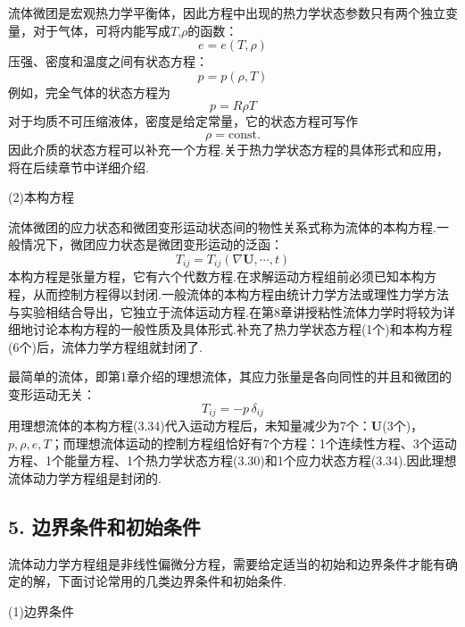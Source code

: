 流体微团是宏观热力学平衡体，因此方程中出现的热力学状态参数只有两个独立变量，对于气体，可将内能写成$T$,$\rho$的函数：
\begin{equation*}
e=e(T,\rho)
\tag{3.30}
\end{equation*}
压强、密度和温度之间有状态方程：
\begin{equation*}
p=p(\rho,T)
\tag{3.31}
\end{equation*}
例如，完全气体的状态方程为
\begin{equation*}
p=R\rho T
\tag{3.32a}
\end{equation*}
对于均质不可压缩液体，密度是给定常量，它的状态方程可写作
\begin{equation*}
\rho=\mathrm{const.}
\tag{3.32b}
\end{equation*}
因此介质的状态方程可以补充一个方程.关于热力学状态方程的具体形式和应用，将在后续章节中详细介绍.

(2)本构方程

流体微团的应力状态和微团变形运动状态间的物性关系式称为流体的本构方程.一般情况下，微团应力状态是微团变形运动的泛函：
\begin{equation*}
T_{ij}=T_{ij}(\nabla\boldsymbol{U},\cdots,t)
\tag{3.33}
\end{equation*}
本构方程是张量方程，它有六个代数方程.在求解运动方程组前必须已知本构方程，从而控制方程得以封闭.一般流体的本构方程由统计力学方法或理性力学方法与实验相结合导出，它独立于流体运动方程.在第8章讲授粘性流体力学时将较为详细地讨论本构方程的一般性质及具体形式.补充了热力学状态方程(1个)和本构方程(6个)后，流体力学方程组就封闭了.

最简单的流体，即第1章介绍的理想流体，其应力张量是各向同性的并且和微团的变形运动无关：
\begin{equation*}
T_{ij}=-p\,\delta_{ij}
\tag{3.34}
\end{equation*}
用理想流体的本构方程(3.34)代入运动方程后，未知量减少为7个：$\boldsymbol{U}$(3个)，$p,\rho,e,T$；而理想流体运动的控制方程组恰好有7个方程：1个连续性方程、3个运动方程、1个能量方程、1个热力学状态方程(3.30)和1个应力状态方程(3.34).因此理想流体动力学方程组是封闭的.

\subsection*{5. 边界条件和初始条件}

流体动力学方程组是非线性偏微分方程，需要给定适当的初始和边界条件才能有确定的解，下面讨论常用的几类边界条件和初始条件.

(1)边界条件


